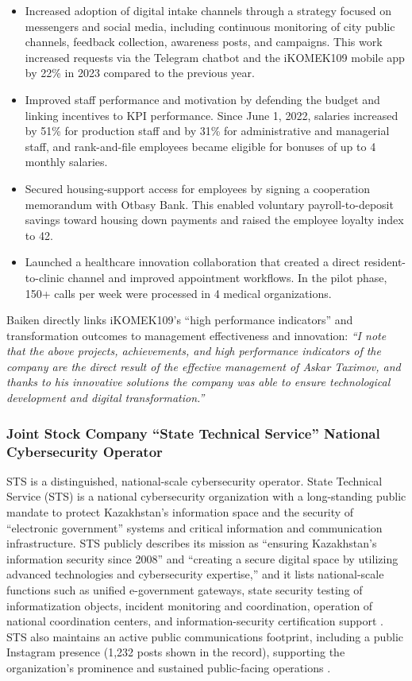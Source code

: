 \begin{itemize}[nosep]
\item Increased adoption of digital intake channels through a strategy focused on messengers and social media, including continuous monitoring of city public channels, feedback collection, awareness posts, and campaigns. This work increased requests via the Telegram chatbot and the iKOMEK109 mobile app by 22\% in 2023 compared to the previous year.
\item Improved staff performance and motivation by defending the budget and linking incentives to KPI performance. Since June 1, 2022, salaries increased by 51\% for production staff and by 31\% for administrative and managerial staff, and rank-and-file employees became eligible for bonuses of up to 4 monthly salaries.
\item Secured housing-support access for employees by signing a cooperation memorandum with Otbasy Bank. This enabled voluntary payroll-to-deposit savings toward housing down payments and raised the employee loyalty index to 42.
\item Launched a healthcare innovation collaboration that created a direct resident-to-clinic channel and improved appointment workflows. In the pilot phase, 150+ calls per week were processed in 4 medical organizations.
\end{itemize}

Baiken directly links iKOMEK109’s ``high performance indicators'' and transformation outcomes to \mrls management effectiveness and innovation:
\emph{``I note that the above projects, achievements, and high performance indicators of the company are the direct result of the effective management of Askar Taximov, and thanks to his innovative solutions the company was able to ensure technological development and digital transformation.''}

\subsubsection{Joint Stock Company “State Technical Service” National Cybersecurity Operator}

\label{subsubsec:RoleSTS}

STS is a distinguished, national-scale cybersecurity operator.
State Technical Service (STS) is a national cybersecurity organization with a long-standing public mandate to protect Kazakhstan’s information space and the security of ``electronic government'' systems and critical information and communication infrastructure. STS publicly describes its mission as ``ensuring Kazakhstan’s information security since 2008'' and ``creating a secure digital space by utilizing advanced technologies and cybersecurity expertise,'' and it lists national-scale functions such as unified e-government gateways, state security testing of informatization objects, incident monitoring and coordination, operation of national coordination centers, and information-security certification support .
STS also maintains an active public communications footprint, including a public Instagram presence (1,232 posts shown in the record), supporting the organization’s prominence and sustained public-facing operations .

